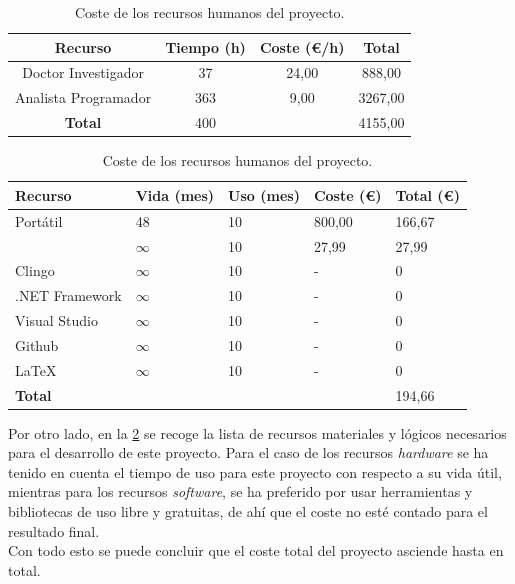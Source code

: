 \begin{table}[!h]
	\centering
	\begin{tabular}{ c c c c }
		\bfseries{Recurso} & \bfseries{Tiempo (h)} & \bfseries{Coste (\euro/h)} & \bfseries{Total} \\
		\hline
		Doctor Investigador & 37 & 24,00 & 888,00 \\
		Analista Programador & 363 & 9,00 & 3267,00 \\
		\hline
		\bfseries{Total} & 400 & & 4155,00 \\
		\hline
	\end{tabular}
	\caption{Coste de los recursos humanos del proyecto.}\label{table:costehumano}
\end{table}

\begin{table}[!h]
	\centering
	\begin{tabularx}{\textwidth}{ l X X X X }
		\bfseries{Recurso} & \bfseries{Vida (mes)} & \bfseries{Uso (mes)} & \bfseries{Coste (\euro)} & \bfseries{Total (\euro)} \\
		\hline
		Portátil & 48 & 10 & 800,00 & 166,67 \\
		\cities & $\infty$ & 10 & 27,99 & 27,99 \\
		Clingo & $\infty$ & 10 & - & 0 \\
		.NET Framework & $\infty$ & 10 & - & 0 \\
		Visual Studio & $\infty$ & 10 & - & 0 \\
		Github & $\infty$ & 10 & - & 0 \\
		LaTeX & $\infty$ & 10 & - & 0 \\
		\hline
		\bfseries{Total} & & & & 194,66 \\
		\hline
	\end{tabularx}
	\caption{Coste de los recursos humanos del proyecto.}\label{table:costematerial}
\end{table}

Por otro lado, en la \ref{table:costematerial} se recoge la lista de recursos materiales y lógicos necesarios para el desarrollo de este proyecto. Para el caso de los recursos \textit{hardware} se ha tenido en cuenta el tiempo de uso para este proyecto con respecto a su vida útil, mientras para los recursos \textit{software}, se ha preferido por usar herramientas y bibliotecas de uso libre y gratuitas, de ahí que el coste no esté contado para el resultado final. \\

Con todo esto se puede concluir que el coste total del proyecto asciende hasta  en total.

